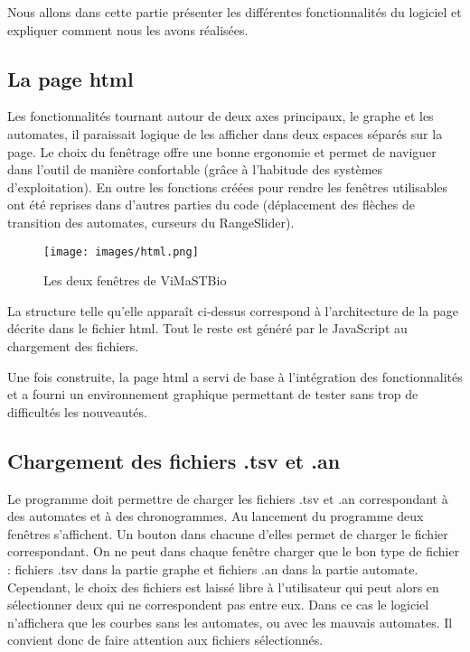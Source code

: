 
Nous allons dans cette partie présenter les différentes fonctionnalités du logiciel et expliquer comment nous les avons réalisées.

\bigbreak
\subsection{La page html}
\bigbreak

Les fonctionnalités tournant autour de deux axes principaux, le graphe et les automates, il paraissait logique de les afficher dans deux espaces séparés sur la page. Le choix du fenêtrage offre une bonne ergonomie et permet de naviguer dans l’outil de manière confortable (grâce à l’habitude des systèmes d’exploitation). En outre les fonctions créées pour rendre les fenêtres utilisables ont été reprises dans d’autres parties du code (déplacement des flèches de transition des automates, curseurs du RangeSlider).

\begin{figure}[!h]
  \centering
  \texttt{[image: images/html.png]}
  \caption{Les deux fenêtres de ViMaSTBio}
\end{figure}
\bigbreak

La structure telle qu’elle apparaît ci-dessus correspond à l’architecture de la page décrite dans le fichier html. Tout le reste est généré par le JavaScript au chargement des fichiers.

Une fois construite, la page html a servi de base à l’intégration des fonctionnalités et a fourni un environnement graphique permettant de tester sans trop de difficultés les nouveautés.

\bigbreak
\newpage
\subsection{Chargement des fichiers .tsv et .an}

\bigbreak

Le programme doit permettre de charger les fichiers .tsv et .an correspondant à des automates et à des chronogrammes. Au lancement du programme deux fenêtres s’affichent. Un bouton dans chacune d’elles permet de charger le fichier correspondant. On ne peut dans chaque fenêtre charger que le bon type de fichier : fichiers .tsv dans la partie graphe et fichiers .an dans la partie automate. Cependant, le choix des fichiers est laissé libre à  l’utilisateur qui peut alors en sélectionner deux qui ne correspondent pas entre eux.  Dans ce cas le logiciel n'affichera que les courbes sans les automates, ou avec les mauvais automates. Il convient donc de faire attention aux fichiers sélectionnés.
\bigbreak

